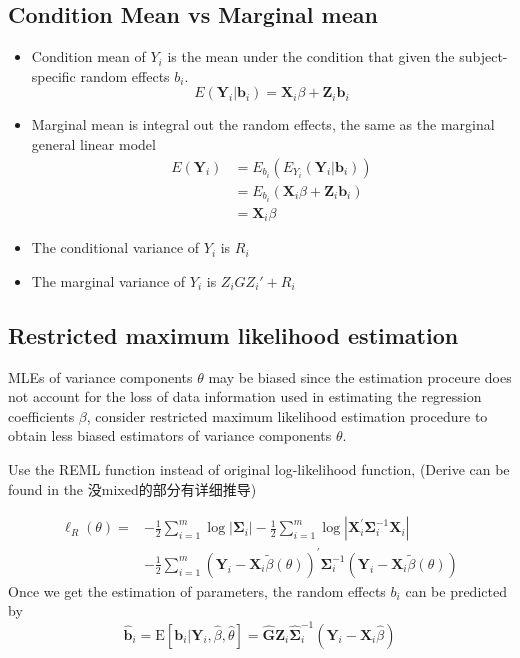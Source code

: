 \documentclass[
]{book}
\providecommand{\tightlist}{%
  \setlength{\itemsep}{0pt}\setlength{\parskip}{0pt}}
\theoremstyle{definition}
\theoremstyle{definition}
\theoremstyle{definition}
\theoremstyle{remark}
\begin{document}
\hypertarget{condition-mean-vs-marginal-mean}{%
\subsection{Condition Mean vs Marginal mean}\label{condition-mean-vs-marginal-mean}}

\begin{itemize}
\tightlist
\item
  Condition mean of \(Y_i\) is the mean under the condition that given the subject-specific random effects \(b_i\).
  \[
  E\left(\mathbf{Y}_{i} | \mathbf{b}_{i}\right)=\mathbf{X}_{i} \beta+\mathbf{Z}_{i} \mathbf{b}_{i}
  \]
\item
  Marginal mean is integral out the random effects, the same as the marginal general linear model
  \[
  \begin{aligned} E\left(\mathbf{Y}_{i}\right) &=E_{b_{i}}\left(E_{Y_{i}}\left(\mathbf{Y}_{i} | \mathbf{b}_{i}\right)\right) \\ &=E_{b_{i}}\left(\mathbf{X}_{i} \beta+\mathbf{Z}_{i} \mathbf{b}_{i}\right) \\ &=\mathbf{X}_{i} \beta \end{aligned}
  \]
\item
  The conditional variance of \(Y_i\) is \(R_i\)
\item
  The marginal variance of \(Y_i\) is \(Z_iGZ_i'+R_i\)
\end{itemize}

\hypertarget{restricted-maximum-likelihood-estimation}{%
\subsection{Restricted maximum likelihood estimation}\label{restricted-maximum-likelihood-estimation}}

MLEs of variance components \(\theta\) may be biased since the estimation proceure does not account for the loss of data information used in estimating the regression coefficients \(\beta\), consider restricted maximum likelihood estimation procedure to obtain less biased estimators of variance components \(\theta\).

Use the REML function instead of original log-likelihood function, (Derive can be found in the 没mixed的部分有详细推导)

\[
\begin{aligned} \ell_{R}(\theta)=&-\frac{1}{2} \sum_{i=1}^{m} \log \left|\boldsymbol{\Sigma}_{i}\right|-\frac{1}{2} \sum_{i=1}^{m} \log \left|\mathbf{X}_{i}^{\prime} \boldsymbol{\Sigma}_{i}^{-1} \mathbf{X}_{i}\right| \\ &-\frac{1}{2} \sum_{i=1}^{m}\left(\mathbf{Y}_{i}-\mathbf{X}_{i} \tilde{\beta}(\theta)\right)^{\prime} \boldsymbol{\Sigma}_{i}^{-1}\left(\mathbf{Y}_{i}-\mathbf{X}_{i} \tilde{\beta}(\theta)\right) \end{aligned}
\]
Once we get the estimation of parameters, the random effects \(b_i\) can be predicted by
\[
\hat{\mathbf{b}}_{i}=\mathrm{E}\left[\mathbf{b}_{i} | \mathbf{Y}_{i}, \hat{\beta}, \hat{\theta}\right]=\hat{\mathbf{G}} \mathbf{Z}_{i} \hat{\mathbf{\Sigma}}_{i}^{-1}\left(\mathbf{Y}_{i}-\mathbf{X}_{i} \hat{\beta}\right)
\]
\end{document}
